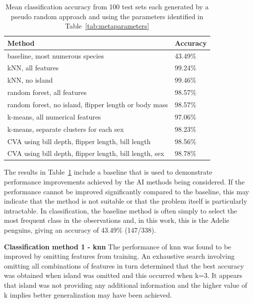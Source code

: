 \documentclass[12pt]{article}
\begin{document}
\begin{table} %
  \small
  \begin{center}
  \vspace{-1.5\baselineskip} %
  \setlength{\abovecaptionskip}{5pt}
  \setlength{\belowcaptionskip}{5pt}
  \fontsize{10}{10}\selectfont %
  \begin{tabular}{l|l}
  Method & Accuracy\\
  \hline
  baseline, most numerous species & 43.49\% \\
  \hline
  kNN, all features	& 99.24\% \\
  kNN, no island &	99.46\% \\
  \hline
  random forest, all features	& 98.57\% \\
  random forest, no island, flipper length or body mass	& 98.57\% \\
  \hline
  k-means, all numerical features & 97.06\% \\
  k-means, separate clusters for each sex & 98.23\% \\
  \hline
  CVA using bill depth, flipper length, bill length	& 98.56\% \\
  CVA using bill depth, flipper length, bill length, sex &98.78\% \\
  \hline
  \end{tabular}
  \vspace{-1.5\baselineskip} %
  \end{center} 
  \caption{Mean classification accuracy from 100 test sets each generated by a pseudo random approach 
  and using the parameters identified in Table~\ref{tab:metaparameters}}
  \vspace{-1\baselineskip} %
  \label{tab:results}
\end{table} 

The results in Table~\ref{tab:results} include a baseline that is used to demonstrate performance improvements achieved by the AI methods being considered. 
If the performance cannot be improved significantly compared to the baseline, 
this may indicate that the method is not suitable or that the problem itself is particularly intractable. 
In classification, the baseline method is often simply to select the most frequent class in the observations and, 
in this work, this is the Adelie penguins, giving an accuracy of 43.49\% (147/338).

\textbf{Classification method 1 - knn}  
The performance of knn was found to be improved by omitting features from training. 
An exhaustive search involving omitting all combinations of features in turn determined that the best accuracy was obtained 
when island was omitted and this occurred when k=3. It appears that island was not providing any additional information 
and the higher value of k implies better generalization may have been achieved.
\end{document}
